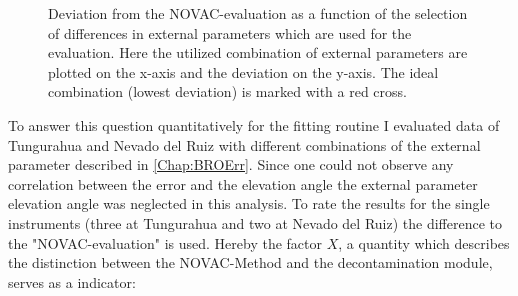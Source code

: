 \documentclass  [
  paper    = a4,
  BCOR     = 10mm,
  twoside,
  fontsize = 12pt,
  fleqn,
  toc      = bibnumbered,
  toc      = listofnumbered,
  numbers  = noendperiod,
  headings = normal,
  listof   = leveldown,
  version  = 3.03
]                                       {scrreprt}
\begin{document}
	\begin{figure}
		\caption{Deviation from the NOVAC-evaluation as a function of the selection of differences in external parameters which are used for the evaluation. Here the utilized combination of external parameters are plotted on the x-axis and the deviation on the y-axis. The ideal combination (lowest deviation) is marked with a red cross.}
		\label{fig:WelcheEP}
	\end{figure}
	To answer this question quantitatively for the fitting routine I evaluated data of Tungurahua and Nevado del Ruiz with different combinations of the external parameter described in \cref{Chap:BROErr}. Since one could not observe any correlation between the  error and the elevation angle the external parameter elevation angle was neglected in this analysis. To rate the results for the single instruments (three at Tungurahua and two at Nevado del Ruiz) the difference to the "NOVAC-evaluation" is used. Hereby the factor $X$, a quantity which describes the distinction between the NOVAC-Method and the decontamination module, serves as a indicator:
\end{document}
